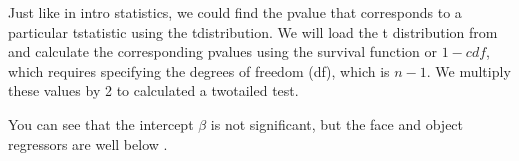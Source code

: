 \documentclass[letterpaper,10pt,english]{sphinxmanual}
\begin{document}
Just like in intro statistics, we could find the p\sphinxhyphen{}value that corresponds to a particular t\sphinxhyphen{}statistic using the t\sphinxhyphen{}distribution. We will load the t distribution from  and calculate the corresponding p\sphinxhyphen{}values using the survival function or  \(1- cdf\), which requires specifying the degrees of freedom (df), which is \(n-1\). We multiply these values by 2 to calculated a two\sphinxhyphen{}tailed test.

You can see that the intercept \(\beta\) is not significant, but the face and object regressors are well below .

\begin{sphinxVerbatim}[commandchars=\\\{\}]
   

   

\PYG{p}{[}  \PYG{p}{]} 
 
 
    
\end{sphinxVerbatim}

\begin{sphinxVerbatim}
\end{sphinxVerbatim}
\end{document}
